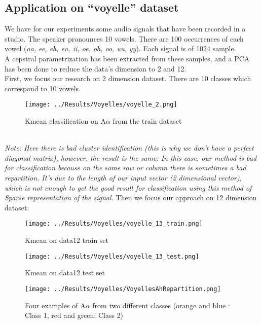 
\subsection{Application on ``voyelle'' dataset }
We have for our experiments some audio signals that have been recorded in a studio. The speaker pronounces 10 vowels. There are 100 occurrences of each vowel (\textit{aa, ee, eh, eu, ii, oe, oh, oo, uu, yy}). Each signal is of 1024 sample.\\
A cepstral parametrization has been extracted from these samples, and a PCA has been done to reduce the data's dimension to  2 and 12. \vspace{0.5cm} \\
First, we focus our research on 2 dimension dataset. There are 10 classes which correspond to 10 vowels.\newline
\begin{figure}[h]
 \centering
 \texttt{[image: ../Results/Voyelles/voyelle\_2.png]}
 \caption{Kmean classification on A$\alpha$ from the train dataset}
\end{figure}
 \\
\textit{Note: Here there is bad cluster identification (this is why we don't have a perfect diagonal matrix), however, the result is the same: In this case, our method is bad for classification because on the same row or column there is sometimes a bad repartition. It's due to the length of our input vector (2 dimensional vector), which is not enough to get the good result for classification using this method of Sparse representation of the signal.} \vspace{0.5cm}
\newpage
Then we focus our approach on 12 dimension dataset:
\begin{figure}[h]
 \centering
 \texttt{[image: ../Results/Voyelles/voyelle\_13\_train.png]}
 \caption{Kmean on data12 train set}
\end{figure}
\begin{figure}[h]
 \centering
 \texttt{[image: ../Results/Voyelles/voyelle\_13\_test.png]}
 \caption{Kmean on data12 test set}
\end{figure}
 \begin{figure}[h]
 \centering
 \texttt{[image: ../Results/Voyelles/VoyellesAhRepartition.png]}
 \caption{ Four examples of A$\alpha$ from two different classes (orange and blue : Class 1, red and green: Class 2)}
\end{figure}
\newpage
